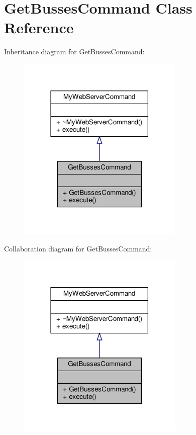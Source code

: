 \hypertarget{classGetBussesCommand}{}\section{Get\+Busses\+Command Class Reference}
\label{classGetBussesCommand}


Inheritance diagram for Get\+Busses\+Command\+:\nopagebreak
\begin{figure}[H]
\begin{center}
\leavevmode
\includegraphics[width=225pt]{classGetBussesCommand__inherit__graph}
\end{center}
\end{figure}


Collaboration diagram for Get\+Busses\+Command\+:\nopagebreak
\begin{figure}[H]
\begin{center}
\leavevmode
\includegraphics[width=225pt]{classGetBussesCommand__coll__graph}
\end{center}
\end{figure}
